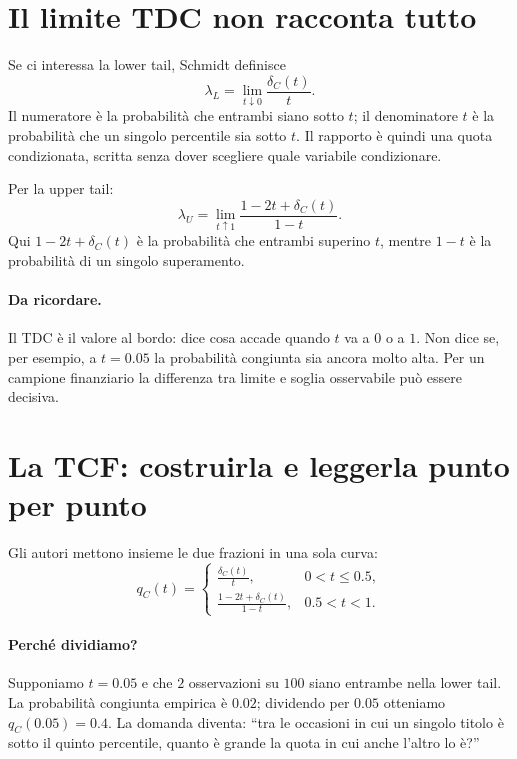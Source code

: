 \documentclass[11pt,a4paper]{article}
\newcommand{\Ricorda}{\paragraph{Da ricordare.}}
\begin{document}
\section{Il limite TDC non racconta tutto}

Se ci interessa la lower tail, Schmidt definisce
\begin{equation}
 \lambda_L=\lim_{t\downarrow0}\frac{\delta_C(t)}{t}.
 \label{eq:lambda-lower}
\end{equation}
Il numeratore è la probabilità che entrambi siano sotto $t$; il denominatore
$t$ è la probabilità che un singolo percentile sia sotto $t$. Il rapporto è
quindi una quota condizionata, scritta senza dover scegliere quale variabile
condizionare.

Per la upper tail:
\begin{equation}
 \lambda_U=\lim_{t\uparrow1}\frac{1-2t+\delta_C(t)}{1-t}.
 \label{eq:lambda-upper}
\end{equation}
Qui $1-2t+\delta_C(t)$ è la probabilità che entrambi superino $t$, mentre
$1-t$ è la probabilità di un singolo superamento.

\Ricorda Il TDC è il valore al bordo: dice cosa accade quando $t$ va a $0$ o
a $1$. Non dice se, per esempio, a $t=0.05$ la probabilità congiunta sia
ancora molto alta. Per un campione finanziario la differenza tra limite e
soglia osservabile può essere decisiva.

\section{La TCF: costruirla e leggerla punto per punto}

Gli autori mettono insieme le due frazioni in una sola curva:
\begin{equation}
 q_C(t)=
 \begin{cases}
  \displaystyle\frac{\delta_C(t)}{t}, & 0<t\leq0.5,\\[1.1ex]
  \displaystyle\frac{1-2t+\delta_C(t)}{1-t}, & 0.5<t<1.
 \end{cases}
 \label{eq:tcf}
\end{equation}

\paragraph{Perché dividiamo?}
Supponiamo $t=0.05$ e che $2$ osservazioni su $100$ siano entrambe nella
lower tail. La probabilità congiunta empirica è $0.02$; dividendo per $0.05$
otteniamo $q_C(0.05)=0.4$. La domanda diventa: ``tra le occasioni in cui un
singolo titolo è sotto il quinto percentile, quanto è grande la quota in cui
anche l'altro lo è?''
\end{document}

